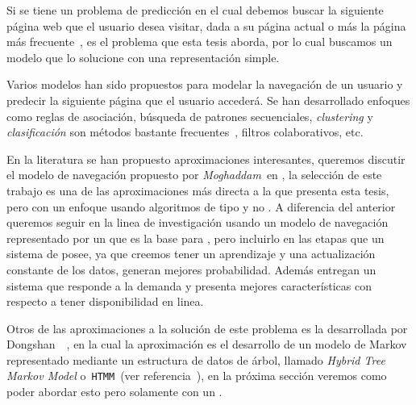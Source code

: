 

Si se tiene un problema de predicción en el cual debemos buscar la siguiente página web que el usuario desea visitar, dada a su página actual o más la página más frecuente~\cite{Poornalatha2012}, es el problema que esta tesis aborda, por lo cual buscamos un modelo que lo solucione con una representación simple.


Varios modelos han sido propuestos para modelar la navegación de un usuario y predecir la siguiente página que el usuario accederá. Se han desarrollado enfoques como  reglas de asociación, búsqueda de patrones secuenciales, \emph{clustering} y \emph{clasificación} son métodos bastante frecuentes~\cite{Moghaddam2009}, filtros colaborativos, etc.


En la literatura se han propuesto aproximaciones interesantes, queremos discutir el modelo de navegación propuesto por \emph{Moghaddam}~\etal en \cite{Moghaddam2009}, la selección de este trabajo es una de las aproximaciones más directa a la que presenta esta tesis, pero con un enfoque usando algoritmos de tipo \losslessdatacompression y no \machinelearning. A  diferencia del anterior queremos seguir en la linea de investigación usando un modelo de navegación representado por un \trie que es la base para \lzSieteOcho, pero incluirlo en las etapas que un sistema de \machinelearning posee, ya que creemos tener un aprendizaje  y una actualización constante de los datos, generan mejores  probabilidad. Además entregan un sistema que responde a la demanda y presenta mejores características con respecto a tener disponibilidad en linea.

Otros de las aproximaciones a la solución de este problema es la desarrollada por {Dongshan}~\etal~\cite{Dongshan2002}, en la cual la aproximación es el desarrollo de un modelo de Markov representado mediante un estructura de datos de árbol, llamado \emph{Hybrid Tree Markov Model} o~\texttt{HTMM}~(ver referencia~\cite{Dongshan2002}), en la próxima sección veremos como poder abordar esto pero solamente con un \trie.
\uncm
 

 



